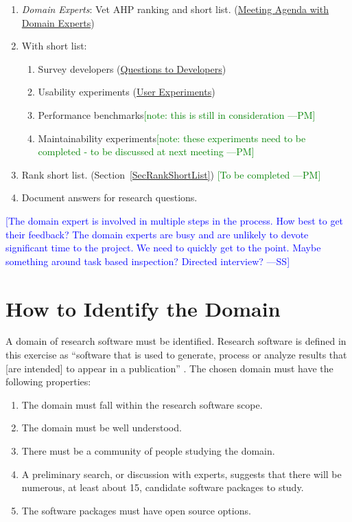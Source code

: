 \documentclass[letterpaper,cleveref]{lipics-v2019}
\newcommand{\authornote}[3]{\textcolor{#1}{[#3 ---#2]}}
\newcommand{\authornote}[3]{}
\newcommand{\wss}[1]{\authornote{blue}{SS}{#1}} %
\newcommand{\pmi}[1]{\authornote{green}{PM}{#1}} %
\theoremstyle{definition}
\begin{document}
\begin{enumerate}
\item \emph{Domain Experts}: Vet AHP ranking and short list. (\href{https://github.com/smiths/AIMSS/blob/master/StateOfPractice/Methodology/Meeting Agenda withmDomainmExperts.pdf}{Meeting Agenda with Domain Experts})
\item With short list:
\begin{enumerate}
\item Survey developers (\href{https://github.com/smiths/AIMSS/blob/master/StateOfPractice/Methodology/Questions to Developers.pdf}{Questions to Developers})
\item Usability experiments (\href{https://github.com/smiths/AIMSS/blob/master/StateOfPractice/Methodology/User Experiments.pdf}{User Experiments})
\item Performance benchmarks\pmi{note: this is still in consideration}
\item Maintainability experiments\pmi{note: these experiments need to be completed - to be discussed at next meeting}
\end{enumerate}
\item Rank short list. (Section~\ref{SecRankShortList}) \pmi{To be completed}
\item Document answers for research questions.
\end{enumerate}

\wss{The domain expert is involved in multiple steps in the process.  How best
  to get their feedback?  The domain experts are busy and are unlikely to devote
  significant time to the project.  We need to quickly get to the point.  Maybe
  something around task based inspection?  Directed interview?}


\section{How to Identify the Domain} \label{SecIdentifyDomain}
A domain of research software must be identified. Research software is defined in this exercise as ``software that is used to generate, process or analyze results that [are intended] to appear in a publication'' \citep{hettrick2014uk}. The chosen domain must have the following properties:

\begin{enumerate}	
	\item The domain must fall within the research software scope.
	\item The domain must be well understood.
	\item There must be a community of people studying the domain.
	\item A preliminary search, or discussion with experts, suggests that there will be numerous, at least about 15, candidate software packages to study.
	\item The software packages must have open source options. 
\end{enumerate}
\end{document}
